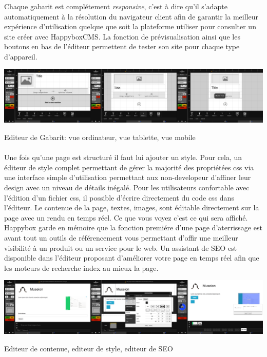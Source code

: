 \documentclass[11pt, a4paper ]{article}
\begin{document}
\begin{spacing}{1.5}
Chaque gabarit est complétement \emph{responsive}, c'est à dire qu'il s'adapte automatiquement à la résolution du navigateur client afin de garantir la meilleur expérience d'utilisation quelque que soit la plateforme utiliser pour consulter un site créer avec HappyboxCMS. La fonction de prévisualisation ainsi que les boutons en bas de l'éditeur permettent de tester son site pour chaque type d'appareil.


\begin{center}

		\includegraphics[width=\textwidth]{images/HBscreen/editeurGabarit.png}
		\caption{Editeur de Gabarit: vue ordinateur, vue tablette, vue mobile}

\end{center}

\paragraph{} %
Une fois qu'une page est structuré il faut lui ajouter un style. Pour cela, un éditeur de style complet permettant de gérer la majorité des propriétées css via une interface simple d'utilisation permettant aux non-developeur d'affiner leur design avec un niveau de détails inégalé. Pour les utilisateurs confortable avec l'édition d'un fichier css, il possible d'écrire directement du code css dans l'éditeur.
Le contenue de la page, textes, images, sont éditable directement sur la page avec un rendu en temps réel. Ce que vous voyez c'est ce qui sera affiché.
Happybox garde en mémoire que la fonction premiére d'une page d'aterrissage est avant tout un outils de référencement vous permettant d'offir une meilleur visibilité à un produit ou un service pour le web. Un assistant de SEO est disponible dans l'éditeur proposant d'améliorer votre page en temps réel afin que les moteurs de recherche index au mieux la page.
\begin{center}
	\includegraphics[width=\textwidth]{images/HBscreen/contenueStyleSeo.png}
	\caption{Editeur de contenue, editeur de style, editeur de SEO}
\end{center}


\end{spacing}
\end{document}
